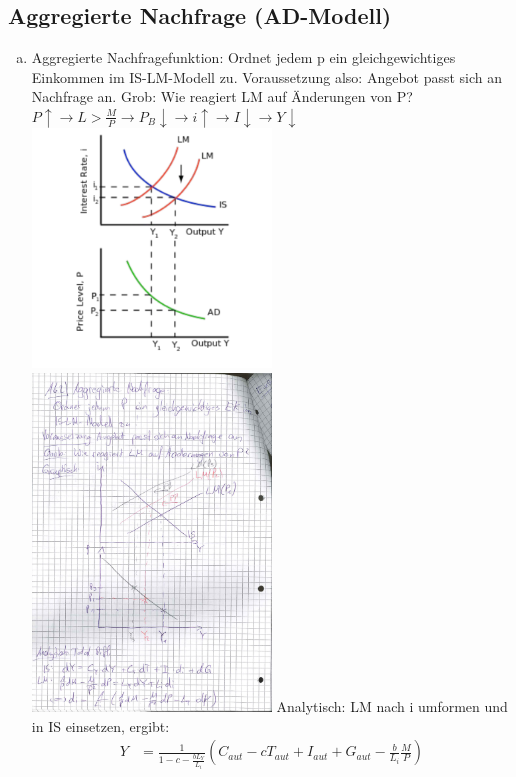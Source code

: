 \documentclass{scrartcl}
\begin{document}
\subsection{Aggregierte Nachfrage (AD-Modell)}
\begin{enumerate}[a)]
  \item Aggregierte Nachfragefunktion: Ordnet jedem p ein gleichgewichtiges Einkommen im IS-LM-Modell zu. Voraussetzung also: Angebot passt sich an Nachfrage an. Grob: Wie reagiert LM auf \"{A}nderungen von P?\\
  $P \uparrow \rightarrow L > \frac{M}{P} \rightarrow P_B \downarrow \rightarrow i \uparrow \rightarrow I \downarrow \rightarrow Y \downarrow$\\
  \includegraphics[width=0.5\textwidth]{Bilder/ADHerleitung.pdf}
  \includegraphics[width=0.5\textwidth]{Bilder/ADHerleitung2.pdf}
  Analytisch: LM nach i umformen und in IS einsetzen, ergibt:
  \begin{align*}
     Y &= \frac{1}{1-c -\frac{b L_Y}{L_i}} \left(C_{aut} - c T_{aut} + I_{aut} +G_{aut} - \frac{b}{L_i}\frac{M}{P}\right)\\

\end{align*}
\end{enumerate}
\end{document}
